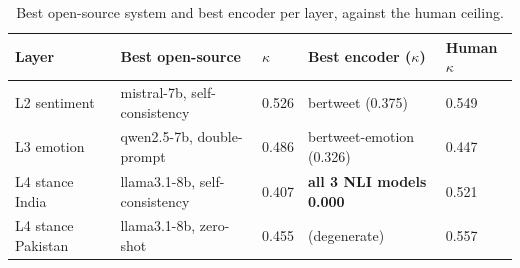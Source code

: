 \begin{table}[h]
  \caption{Best open-source system and best encoder per layer, against the human
    ceiling.}
  \label{tab:opensource}
  \small
  \begin{tabular}{@{}lllll@{}}
    \toprule
    Layer & Best open-source & $\kappa$ & Best encoder ($\kappa$) & Human $\kappa$ \\
    \midrule
    L2 sentiment       & mistral-7b, self-consistency & 0.526 & bertweet (0.375) & 0.549 \\
    L3 emotion         & qwen2.5-7b, double-prompt & 0.486 & bertweet-emotion (0.326) & 0.447 \\
    L4 stance India    & llama3.1-8b, self-consistency & 0.407 & \textbf{all 3 NLI models 0.000} & 0.521 \\
    L4 stance Pakistan & llama3.1-8b, zero-shot & 0.455 & (degenerate) & 0.557 \\
    \bottomrule
  \end{tabular}
\end{table}
